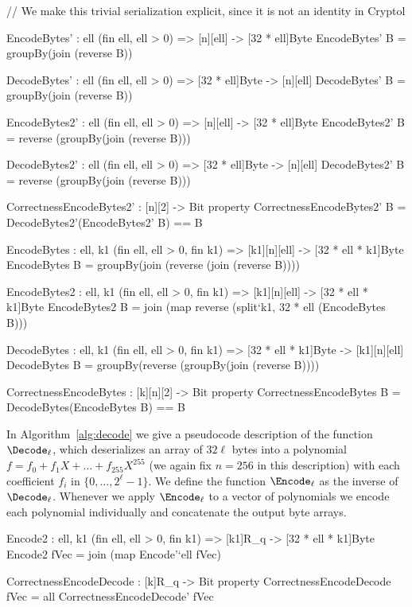 \begin{code}
  // We make this trivial serialization explicit, since it is not an identity in Cryptol

  EncodeBytes' : {ell} (fin ell, ell > 0) => [n][ell] -> [32 * ell]Byte
  EncodeBytes' B = groupBy(join (reverse B))

  DecodeBytes' : {ell} (fin ell, ell > 0) => [32 * ell]Byte -> [n][ell]
  DecodeBytes' B = groupBy(join (reverse B))
  
  EncodeBytes2' : {ell} (fin ell, ell > 0) => [n][ell] -> [32 * ell]Byte
  EncodeBytes2' B = reverse (groupBy(join (reverse B)))

  DecodeBytes2' : {ell} (fin ell, ell > 0) => [32 * ell]Byte -> [n][ell]
  DecodeBytes2' B = reverse (groupBy(join (reverse B)))

  CorrectnessEncodeBytes2' : [n][2] -> Bit
  property CorrectnessEncodeBytes2' B = DecodeBytes2'(EncodeBytes2' B) == B
  
  EncodeBytes : {ell, k1} (fin ell, ell > 0, fin k1) =>
      [k1][n][ell] -> [32 * ell * k1]Byte
  EncodeBytes B = groupBy(join (reverse (join (reverse B))))
    
  EncodeBytes2 : {ell, k1} (fin ell, ell > 0, fin k1) =>
      [k1][n][ell] -> [32 * ell * k1]Byte
  EncodeBytes2 B = join (map reverse (split`{k1, 32 * ell} (EncodeBytes B)))
  
  DecodeBytes : {ell, k1} (fin ell, ell > 0, fin k1) =>
      [32 * ell * k1]Byte -> [k1][n][ell]
  DecodeBytes B = groupBy(reverse (groupBy(join (reverse B))))
  
  CorrectnessEncodeBytes : [k][n][2] -> Bit
  property CorrectnessEncodeBytes B = DecodeBytes(EncodeBytes B) == B
\end{code}

In Algorithm~\ref{alg:decode} we give a pseudocode description of the
function $\Decode_\ell$, which deserializes an array of $32\ell$ bytes
into a polynomial $f = f_0 + f_1X + \dots + f_{255}X^{255}$ 
(we again fix $n=256$ in this description) with each
coefficient $f_i$ in  $\{0,\dots,2^\ell-1\}$. 
We define the function $\Encode_\ell$ as the inverse of $\Decode_\ell$.
Whenever we apply $\Encode_\ell$ to a vector of polynomials we encode
each polynomial individually and concatenate the output byte arrays.

\begin{code}
  Encode2 : {ell, k1} (fin ell, ell > 0, fin k1) => [k1]R_q -> [32 * ell * k1]Byte
  Encode2 fVec = join (map Encode'`{ell} fVec)
  
  CorrectnessEncodeDecode : [k]R_q -> Bit
  property CorrectnessEncodeDecode fVec = all CorrectnessEncodeDecode' fVec
\end{code}

